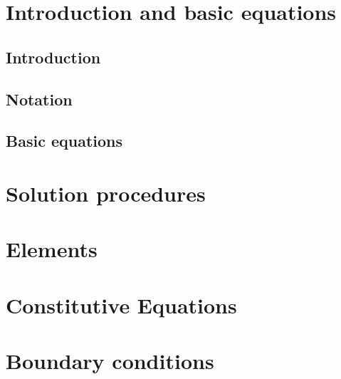 \documentclass[a4paper]{book}
\begin{document}


\clearpage
\setcounter{page}{1}
\pagestyle{headings}

\tableofcontents
\chapter{Introduction and basic equations}
\section{Introduction}

\section{Notation}
\section{Basic equations}


\chapter{Solution procedures}

\chapter{Elements}
\chapter{Constitutive Equations}

\chapter{Boundary conditions}

{}



\end{document}
